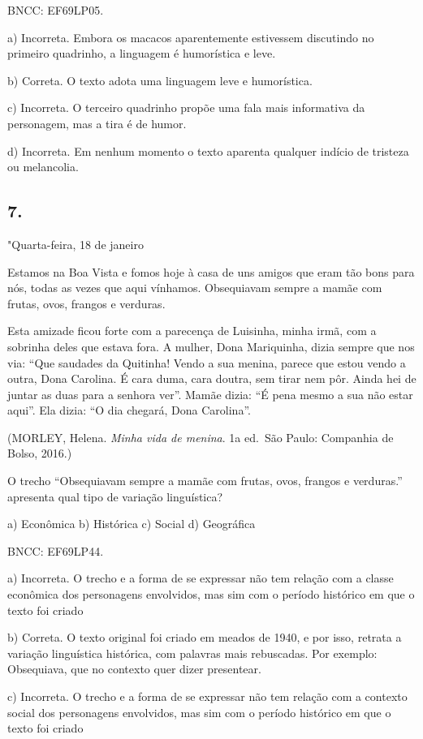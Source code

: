 BNCC: EF69LP05.

a) Incorreta. Embora os macacos aparentemente estivessem discutindo no
primeiro quadrinho, a linguagem é humorística e leve.

b) Correta. O texto adota uma linguagem leve e humorística.

c) Incorreta. O terceiro quadrinho propõe uma fala mais informativa da
personagem, mas a tira é de humor.

d) Incorreta. Em nenhum momento o texto aparenta qualquer indício de
tristeza ou melancolia.


\subsection{7.}

"Quarta-feira, 18 de janeiro

Estamos na Boa Vista e fomos hoje à casa de uns amigos que eram tão bons
para nós, todas as vezes que aqui vínhamos. Obsequiavam sempre a mamãe
com frutas, ovos, frangos e verduras.

Esta amizade ficou forte com a parecença de Luisinha, minha irmã, com a
sobrinha deles que estava fora. A mulher, Dona Mariquinha, dizia sempre
que nos via: ``Que saudades da Quitinha! Vendo a sua menina, parece que
estou vendo a outra, Dona Carolina. É cara duma, cara doutra, sem tirar
nem pôr. Ainda hei de juntar as duas para a senhora ver''. Mamãe dizia:
``É pena mesmo a sua não estar aqui''. Ela dizia: ``O dia chegará, Dona
Carolina''.

(MORLEY, Helena. \emph{Minha vida de menina}. 1a ed.~São Paulo:
Companhia de Bolso, 2016.)

O trecho ``Obsequiavam sempre a mamãe com frutas, ovos, frangos e
verduras.'' apresenta qual tipo de variação linguística?

a) Econômica b) Histórica c) Social d) Geográfica

BNCC: EF69LP44.

a) Incorreta. O trecho e a forma de se expressar não tem relação com a
classe econômica dos personagens envolvidos, mas sim com o período
histórico em que o texto foi criado

b) Correta. O texto original foi criado em meados de 1940, e por isso,
retrata a variação linguística histórica, com palavras mais rebuscadas.
Por exemplo: Obsequiava, que no contexto quer dizer presentear.

c) Incorreta. O trecho e a forma de se expressar não tem relação com a
contexto social dos personagens envolvidos, mas sim com o período
histórico em que o texto foi criado

